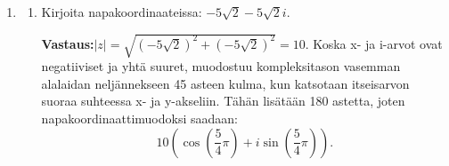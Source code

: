 \documentclass[a4paper,12pt]{article}
\begin{document}
\begin{enumerate}
\underline{Induktioaskel:} Osoitetaan, että väite pätee myös luonnollisella luvulla $k+1$ ja lauseella $$\sum_{j=1}^{k+1} \frac{1}{\sqrt{j}} \leq 2\sqrt{k+1}.$$ Tutkitaan lausetta hyödyntäen induktio-oletusta:
\begin{align*}
    \sum_{j=1}^{k+1} \frac{1}{\sqrt{j}}&=\sum_{j=1}^{k} \frac{1}{\sqrt{j}}+\frac{1}{\sqrt{k+1}}\\
    &\stackrel{\text{IO}}{\leq}2\sqrt{k}+\frac{1}{\sqrt{k+1}}.
\end{align*}
Nyt katsomme saammeko todistettua induktio-oletuksella saadun epäyhtälön oikean puolen olevan pienempi tai yhtä suuri kuin induktioväitteen epäyhtälön oikea puoli:
\begin{align*}
    2\sqrt{k}+\frac{1}{\sqrt{k+1}}&\leq 2\sqrt{k+1}\\
    \frac{1}{\sqrt{k+1}}&\leq 2\sqrt{k+1}-2\sqrt{k}\\
    \frac{1}{\sqrt{k+1}}&\leq 2(\sqrt{k+1}-\sqrt{k})\\
    \frac{1}{\sqrt{k+1}}&\leq 2(\frac{1}{\sqrt{k+1}+\sqrt{k}})\quad \text{(sijoitus (a)-kohdasta)}\\
    \frac{2}{2\sqrt{k+1}}&\leq \frac{2}{\sqrt{k+1}+\sqrt{k}}\\
    \frac{2}{\sqrt{k+1}+\sqrt{k+1}}&\leq \frac{2}{\sqrt{k+1}+\sqrt{k}}\\.
\end{align*}
Edellisestä nähdään, että vasen puoli on pienempi kuin oikea puoli, koska $\sqrt{k+1} > \sqrt{k}$. Vasemman puolen nimittäjä on suurempi, joten murtoluku on pienempi. Väite on siis tosi. 

\underline{Johtopäätös:} Alkuaskeleesta ja induktioaskeleesta seuraa induktioperiaatteen nojalla, että $$\sum_{j=1}^n \frac{1}{\sqrt{j}} \leq 2\sqrt{n}.$$ \vspace{1em}

\item 

\begin{enumerate}
    \item Kirjoita napakoordinaateissa: $-5\sqrt{2}-5\sqrt{2}i$.
   
    \textbf{Vastaus:}$|z| = \sqrt{(-5\sqrt{2})^2+(-5\sqrt{2})^2}= 10$. Koska x- ja i-arvot ovat negatiiviset ja yhtä suuret, muodostuu kompleksitason vasemman alalaidan neljännekseen 45 asteen kulma, kun katsotaan itseisarvon suoraa suhteessa x- ja y-akseliin. Tähän lisätään 180 astetta, joten napakoordinaattimuodoksi saadaan:
    \begin{equation*}
        10(\cos(\frac{5}{4}\pi)+i\sin(\frac{5}{4}\pi)).
    \end{equation*}
    

\end{enumerate}
\end{enumerate}
\end{document}
